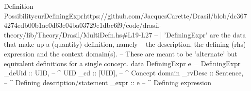 \begin{haskell}{Definition Possibility}{curDefiningExpr}{}{https://github.com/JacquesCarette/Drasil/blob/dc3674274edb00b1ae0d63e04ba03729e1dbc6f9/code/drasil-theory/lib/Theory/Drasil/MultiDefn.hs\#L19-L27}
-- | 'DefiningExpr' are the data that make up a (quantity) definition, namely
--   the description, the defining (rhs) expression and the context domain(s).
--   These are meant to be 'alternate' but equivalent definitions for a single concept.
data DefiningExpr e = DefiningExpr {
  _deUid  :: UID,      -- ^ UID
  _cd     :: [UID],    -- ^ Concept domain
  _rvDesc :: Sentence, -- ^ Defining description/statement
  _expr   :: e         -- ^ Defining expression
}
\end{haskell}

